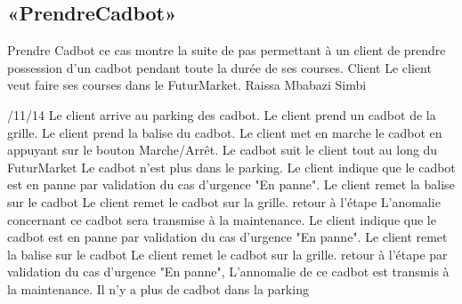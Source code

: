 \subsection{«PrendreCadbot»}
\startCU
\nom Prendre Cadbot
\but ce cas montre la suite de pas permettant à un client de prendre possession d'un cadbot pendant toute la durée de ses courses.
\acteur Client
\precondition Le client veut faire ses courses dans le FuturMarket.
\auteur Raissa Mbabazi Simbi
\date 7/11/14
\nominal %
\startnominal
\etape[PC:SA1] Le client arrive au parking des cadbot.
\etape[PC:RETOUR] Le client prend un cadbot de la grille.
\etape[PC:SE1] Le client prend la balise du cadbot.
\etape Le client met en marche le cadbot en appuyant sur le bouton Marche/Arrêt.
\etape Le cadbot suit le client tout au long du FuturMarket
\stopnominal
\postcondition Le cadbot n'est plus dans le parking.
\alternatifs
\startalternatif[PC:SA1] %
\etape Le client indique que le cadbot est en panne par validation du cas d'urgence "En panne".
\etape Le client remet la balise sur le cadbot
\etape Le client remet le cadbot sur la grille.
\etape retour à l'étape \in[PC:RETOUR]
\stopcondition
\postcondition L'anomalie concernant ce cadbot sera transmise à la maintenance.
\stopalternatif
\startalternatif[PC:SE1]
\etape Le client indique que le cadbot est en panne par validation du cas d'urgence "En panne".
\etape Le client remet la balise sur le cadbot
\etape Le client remet le cadbot sur la grille.
\etape retour à l'étape \in[PC:RETOUR]
\stopcondition
\postcondition par validation du cas d'urgence "En panne", L'annomalie de ce cadbot est transmis à la maintenance.
\stopalternatif
\exception
Il n'y a plus de cadbot dans la parking
\stopCU
